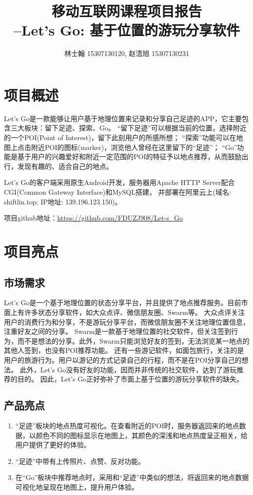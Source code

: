 \documentclass[UTF8]{article}
\begin{document}
\begin{titlepage}
\title{\bfseries 移动互联网课程项目报告\\ --Let's Go: 基于位置的游玩分享软件}
\author{林士翰 15307130120, 赵浯旭 15307130231}
\date{}
\maketitle
\tableofcontents
\thispagestyle{empty}
\end{titlepage}

\section{项目概述}
Let's Go是一款能够让用户基于地理位置来记录和分享自己足迹的APP，它主要包含三大板块：留下足迹、探索、Go。
“留下足迹”可以根据当前的位置，选择附近的一个POI(Point of Interest)，留下此刻用户的所感所想；
“探索”功能可以在地图上点击附近POI的图标(marker)，浏览他人曾经在这里留下的“足迹”；
“Go”功能是基于用户的兴趣爱好和附近一定范围的POI的特征予以地点推荐，从而鼓励出行，发现有趣的、适合自己的地点。

Let's Go的客户端采用原生Android开发，服务器用Apache HTTP Server配合CGI(Common Gateway Interface)和MySQL搭建，
并部署在阿里云上(域名: shiftlin.top; IP地址: 139.196.123.150)。

项目github地址：\url{https://github.com/FDUZJ908/Let-s_Go}


\section{项目亮点}
\subsection{市场需求}
Let's Go是一个基于地理位置的状态分享平台，并且提供了地点推荐服务。目前市面上有许多状态分享软件，如大众点评、微信朋友圈、Swarm等。
大众点评关注用户的消费行为和分享，不是游玩分享平台，而微信朋友圈不关注地理位置信息，注重好友之间的分享。
Swarm是一款基于地理位置的社交软件，但关注签到行为，而不是想法的分享。此外，Swarm只能浏览好友的签到，无法浏览某一地点的其他人签到，也没有POI推荐功能。
还有一些游记软件，如面包旅行，关注的是用户的旅游行为。用户以游记的方式记录自己的行程，而不是在POI分享自己的想法。
此外，Let's Go没有好友的功能，因而并非传统的社交软件，达到了游玩推荐的目的。
因此，Let's Go正好弥补了市面上基于位置的游玩分享软件的缺失。

\subsection{产品亮点}
\begin{enumerate}
    \item “足迹”板块的地点热度可视化。在查看附近的POI时，服务器返回来的地点数据，以颜色不同的图标显示在地图上，其颜色的深浅和地点热度呈正相关，给用户提供了更好的体验。
    \item “足迹”中带有上传照片、点赞、反对功能。
    \item 在“Go”板块中推荐地点时，采用和“足迹”中类似的想法，将返回来的地点数据可视化地呈现在地图上，提升用户体验。
\end{enumerate}
\end{document}
